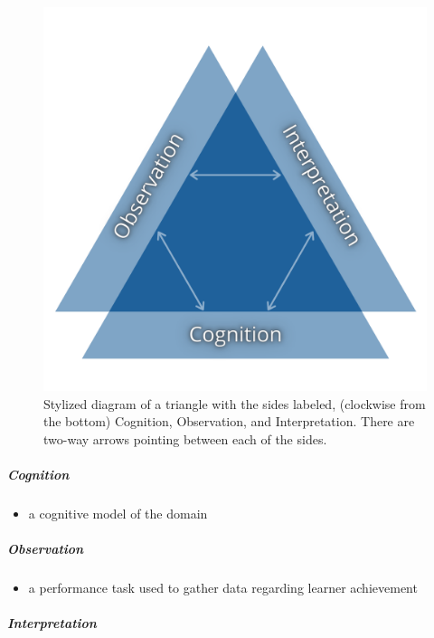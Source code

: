 \documentclass[
]{book}
\providecommand{\tightlist}{%
  \setlength{\itemsep}{0pt}\setlength{\parskip}{0pt}}
\begin{document}
\begin{figure}
\centering
\includegraphics{assets/otessa22/assessment-triangle.png}
\caption{Stylized diagram of a triangle with the sides labeled, (clockwise from the bottom) Cognition, Observation, and Interpretation. There are two-way arrows pointing between each of the sides.}
\end{figure}

\hypertarget{cognition}{%
\subparagraph*{Cognition}\label{cognition}}

\begin{itemize}
\tightlist
\item
  a cognitive model of the domain
\end{itemize}

\hypertarget{observation}{%
\subparagraph*{Observation}\label{observation}}

\begin{itemize}
\tightlist
\item
  a performance task used to gather data regarding learner achievement
\end{itemize}

\hypertarget{interpretation}{%
\subparagraph*{Interpretation}\label{interpretation}}
\end{document}
